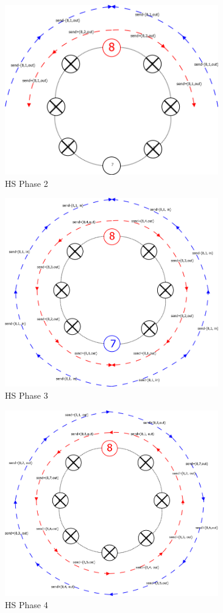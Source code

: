 \begin{figure}[h]
	\centering
	\includegraphics[width=350px]{gfx/HS_p2.png}
	\caption{HS Phase 2}
	\label{img:hs_p2}
\end{figure}

\begin{figure}[h]
    \centering
    \includegraphics[width=350px]{gfx/HS_p3.png}
    \caption{HS Phase 3}
    \label{img:hs_p3}
\end{figure}

\begin{figure}[h]
	\centering
	\includegraphics[width=350px]{gfx/HS_p4.png}
	\caption{HS Phase 4}
	\label{img:hs_p4}
\end{figure}

